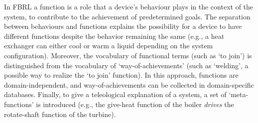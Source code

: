 \documentclass[
]{ceurart}
\begin{document}
\begin{itemize}
    In FBRL a function is a role that a device's behaviour plays in the context of the system, to contribute to the achievement of predetermined goals. The separation between behaviours and functions explains the possibility for a device to have different functions despite the behavior remaining the same (e.g., a heat exchanger can either cool or warm a liquid depending on the system configuration). Moreover, the vocabulary of functional terms (such as `to join') is distinguished from the vocabulary of `way-of-achievements' (such as `welding', a possible way to realize the `to join' function). 
    In this approach, functions are domain-independent, and way-of-achievements can be collected in domain-specific databases.
    Finally, to give a teleological explanation of a system, a set of `meta-functions' is introduced (e.g., the give-heat function of the boiler \textit{drives} the rotate-shaft function of the turbine). 
\end{itemize}
\end{document}
